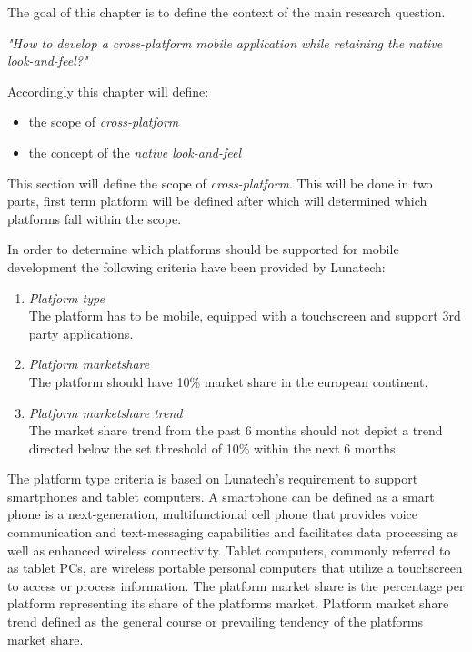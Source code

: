 The goal of this chapter is to define the context of the main research question.

\indent \emph{"How to develop a cross-platform mobile application while retaining the native look-and-feel?"}

\noindent Accordingly this chapter will define:
\begin{itemize}
\item the scope of \emph{cross-platform}
\item the concept of the \emph{native look-and-feel}
\end{itemize}

This section will define the scope of \emph{cross-platform}. This will be done in two parts, first term platform will be defined after which will determined which platforms fall within the scope.

In order to determine which platforms should be supported for mobile development the following criteria have been provided by Lunatech:

\begin{enumerate}	
\item \emph{Platform type}\\
The platform has to be mobile, equipped with a touchscreen and support 3rd party applications. %
\item \emph{Platform marketshare}\\
The platform should have 10\% market share in the european continent.
\item \emph{Platform marketshare trend}\\
The market share trend from the past 6 months should not depict a trend directed below the set threshold of 10\% within the next 6 months.
\end{enumerate}

The platform type criteria is based on Lunatech's requirement to support smartphones and tablet computers. A smartphone can be defined as a smart phone is a next-generation, multifunctional cell phone that provides voice communication and text-messaging capabilities and facilitates data processing as well as enhanced wireless connectivity.\cite{Ni2006} Tablet computers, commonly referred to as tablet PCs, are wireless portable personal computers that utilize a touchscreen to access or process information.\cite{Leigh2011} The platform market share is the percentage per platform representing its share of the platforms market. Platform market share trend defined as the general course or prevailing tendency of the platforms market share. %


